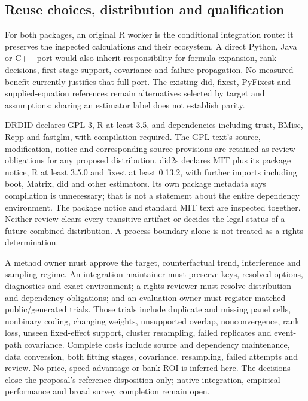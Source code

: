 \subsection{Reuse choices, distribution and qualification}
For both packages, an original R worker is the conditional integration route:
it preserves the inspected calculations and their ecosystem. A direct Python,
Java or C++ port would also inherit responsibility for formula expansion,
rank decisions, first-stage support, covariance and failure propagation. No
measured benefit currently justifies that full port. The existing did,
fixest, PyFixest and supplied-equation references remain alternatives selected
by target and assumptions; sharing an estimator label does not establish parity.
\citep{exec24_drdid_reuse_source,exec24_did2s_reuse_source,v12_sw_drdid,v12_sw_did2s}

DRDID declares GPL-3, R at least 3.5, and dependencies including trust, BMisc,
Rcpp and fastglm, with compilation required. The GPL text's source,
modification, notice and corresponding-source provisions are retained as
review obligations for any proposed distribution. did2s declares MIT plus its
package notice, R at least 3.5.0 and fixest at least 0.13.2, with further
imports including boot, Matrix, did and other estimators. Its own package
metadata says compilation is unnecessary; that is not a statement about the
entire dependency environment. The package notice and standard MIT text are
inspected together. Neither review clears every transitive artifact or decides
the legal status of a future combined distribution. A process boundary alone
is not treated as a rights determination.\citep{exec24_drdid_reuse_source,exec24_did2s_reuse_source}

A method owner must approve the target, counterfactual trend, interference and
sampling regime. An integration maintainer must preserve keys, resolved
options, diagnostics and exact environment; a rights reviewer must resolve
distribution and dependency obligations; and an evaluation owner must register
matched public/generated trials. Those trials include duplicate and missing
panel cells, nonbinary coding, changing weights, unsupported overlap,
nonconvergence, rank loss, unseen fixed-effect support, cluster resampling,
failed replicates and event-path covariance. Complete costs include source
and dependency maintenance, data conversion, both fitting stages, covariance,
resampling, failed attempts and review. No price, speed advantage or bank ROI
is inferred here. The decisions close the proposal's reference disposition
only; native integration, empirical performance and broad survey completion
remain open.\citep{exec24_drdid_reuse_source,exec24_did2s_reuse_source}
